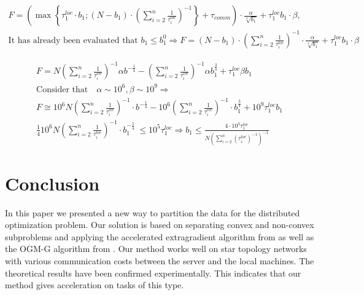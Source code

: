 \documentclass{article}
\begin{document}
\begin{gather*}
    F=\left(\max \left\{\tau_1^{loc} \cdot b_1 ;\left(N-b_1\right) \cdot\left(\sum_{i=2}^n \frac{1}{\tau_i^{loc}}\right)^{-1}\right\}+\tau_{comm}\right) \cdot \frac{\alpha}{\sqrt[4]{b_1}}+\tau_1^{loc} b_1 \cdot \beta, \\
    \text {It has already been evaluated that } b_1 \leq b_1^0 \Rightarrow F=\left(N-b_1\right)\cdot \left(\sum_{i=2}^n \frac{1}{\tau_i^{loc}}\right)^{-1} \cdot \frac{\alpha}{\sqrt[4]{b_1}}+\tau_1^{loc} b_1 \cdot \beta
\end{gather*}


\begin{gather*}
    F=N\left(\sum_{i=2}^n \frac{1}{\tau_i^{loc}}\right)^{-1} \alpha b^{-\frac{1}{4}}-\left(\sum_{i=2}^n \frac{1}{\tau_i^{loc}}\right)^{-1} \alpha b_1^{\frac{3}{4}}+\tau_1^{l o c} \beta b_1 \\
    \text {Consider that} \quad \alpha \sim 10^6, \beta \sim 10^9 \Rightarrow \\ 
    F \cong 10^6 N \left(\sum_{i=2}^n \frac{1}{\tau_i^{loc}}\right)^{-1} \cdot b^{-\frac{1}{4}}-10^6 \left(\sum_{i=2}^n \frac{1}{\tau_i^{loc}}\right)^{-1} \cdot b_1^{\frac{3}{4}}+10^9 \tau_1^{loc} b_1 \\
    \frac{1}{4} 10^6 N \left(\sum_{i=2}^n \frac{1}{\tau_i^{loc}}\right)^{-1} \cdot b_1^{-\frac{5}{4}} \ \leq 10^5 \tau_1^{loc} \Rightarrow b_1 \leq \frac{4 \cdot 10^3 \tau_1^{loc}}{N\left(\sum_{i=2}^n\left(\tau_i^{loc}\right)^{-1}\right)^{-1}}
\end{gather*}

\section{Conclusion}

In this paper we presented a new way to partition the data for the distributed optimization problem. Our solution is based on separating convex and non-convex subproblems and applying the accelerated extragradient algorithm from \citep{kovalev2022optimal} as well as the OGM-G algorithm from \citep{kim2021optimizing}. Our method works well on star topology networks with various communication costs between the server and the local machines. The theoretical results have been confirmed experimentally. This indicates that our method gives acceleration on tasks of this type.


  
\end{document}
